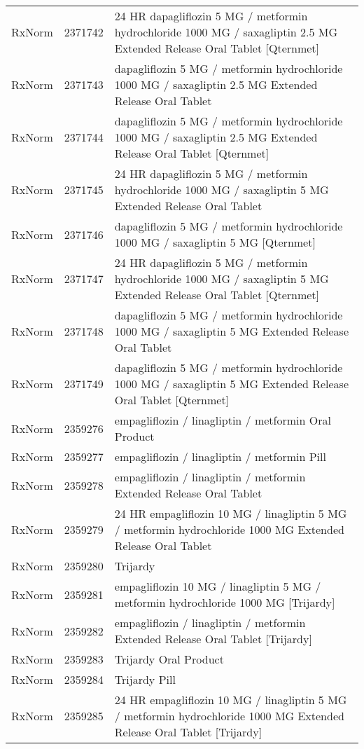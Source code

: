 \begin{longtable}{p{}p{}p{}}
  RxNorm & 2371742 & 24 HR dapagliflozin 5 MG / metformin hydrochloride 1000 MG / saxagliptin 2.5 MG Extended Release Oral Tablet [Qternmet] \\ 
  RxNorm & 2371743 & dapagliflozin 5 MG / metformin hydrochloride 1000 MG / saxagliptin 2.5 MG Extended Release Oral Tablet \\ 
  RxNorm & 2371744 & dapagliflozin 5 MG / metformin hydrochloride 1000 MG / saxagliptin 2.5 MG Extended Release Oral Tablet [Qternmet] \\ 
  RxNorm & 2371745 & 24 HR dapagliflozin 5 MG / metformin hydrochloride 1000 MG / saxagliptin 5 MG Extended Release Oral Tablet \\ 
  RxNorm & 2371746 & dapagliflozin 5 MG / metformin hydrochloride 1000 MG / saxagliptin 5 MG [Qternmet] \\ 
  RxNorm & 2371747 & 24 HR dapagliflozin 5 MG / metformin hydrochloride 1000 MG / saxagliptin 5 MG Extended Release Oral Tablet [Qternmet] \\ 
  RxNorm & 2371748 & dapagliflozin 5 MG / metformin hydrochloride 1000 MG / saxagliptin 5 MG Extended Release Oral Tablet \\ 
  RxNorm & 2371749 & dapagliflozin 5 MG / metformin hydrochloride 1000 MG / saxagliptin 5 MG Extended Release Oral Tablet [Qternmet] \\ 
  RxNorm & 2359276 & empagliflozin / linagliptin / metformin Oral Product \\ 
  RxNorm & 2359277 & empagliflozin / linagliptin / metformin Pill \\ 
  RxNorm & 2359278 & empagliflozin / linagliptin / metformin Extended Release Oral Tablet \\ 
  RxNorm & 2359279 & 24 HR empagliflozin 10 MG / linagliptin 5 MG / metformin hydrochloride 1000 MG Extended Release Oral Tablet \\ 
  RxNorm & 2359280 & Trijardy \\ 
  RxNorm & 2359281 & empagliflozin 10 MG / linagliptin 5 MG / metformin hydrochloride 1000 MG [Trijardy] \\ 
  RxNorm & 2359282 & empagliflozin / linagliptin / metformin Extended Release Oral Tablet [Trijardy] \\ 
  RxNorm & 2359283 & Trijardy Oral Product \\ 
  RxNorm & 2359284 & Trijardy Pill \\ 
  RxNorm & 2359285 & 24 HR empagliflozin 10 MG / linagliptin 5 MG / metformin hydrochloride 1000 MG Extended Release Oral Tablet [Trijardy] \\ 

\end{longtable}
